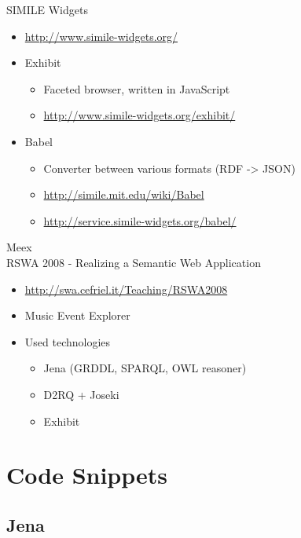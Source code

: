 \documentclass[xcolor=dvipsnames]{beamer}
\begin{document}
\begin{frame}{SIMILE Widgets}
\begin{itemize}
	\item \url{http://www.simile-widgets.org/}
	\item Exhibit
		\begin{itemize}
			\item Faceted browser, written in JavaScript
			\item \url{http://www.simile-widgets.org/exhibit/} 
		\end{itemize}
	\item Babel
		\begin{itemize}
			\item Converter between various formats (RDF -> JSON)
			\item \url{http://simile.mit.edu/wiki/Babel} 
			\item \url{http://service.simile-widgets.org/babel/} 
		\end{itemize}
\end{itemize}
\end{frame}

\begin{frame}{Meex\\RSWA 2008 - Realizing a Semantic Web Application}

\begin{itemize}
	\item \url{http://swa.cefriel.it/Teaching/RSWA2008}
	\item Music Event Explorer
	\item Used technologies
		\begin{itemize}
			\item Jena (GRDDL, SPARQL, OWL reasoner)
			\item D2RQ + Joseki
			\item Exhibit
		\end{itemize}
\end{itemize}
\end{frame}

\section{Code Snippets}

\newcommand{\java}[1]{
\begin{frame}{#1}
\inputminted[linenos, fontsize=\tiny, frame=lines, tabsize=4]{java}{src/mi_swe/#1.java}
\end{frame}
}
 
\subsection{Jena}
\frame{\tableofcontents[currentsubsection]}
 
\end{document}
